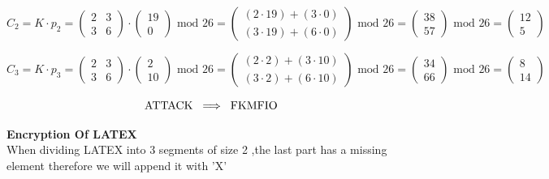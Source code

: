 \[
C_2 = K \cdot p_2 = \begin{pmatrix} 2 & 3 \\ 3 & 6 \end{pmatrix} \cdot \begin{pmatrix} 19 \\ 0
\end{pmatrix} \text{ mod } 26 = \begin{pmatrix} (2 \cdot 19) + (3 \cdot 0) \\ (3 \cdot 19) +
(6 \cdot 0) \end{pmatrix} \text{ mod } 26 = \begin{pmatrix} 38 \\ 57 \end{pmatrix}
\text{ mod } 26 = \boxed{\begin{pmatrix} 12 \\ 5 \end{pmatrix}}
\]

\[
C_3 = K \cdot p_3 = \begin{pmatrix} 2 & 3 \\ 3 & 6 \end{pmatrix} \cdot \begin{pmatrix} 2 \\ 10
\end{pmatrix} \text{ mod } 26 = \begin{pmatrix} (2 \cdot 2) + (3 \cdot 10) \\ (3 \cdot 2) +
(6 \cdot 10) \end{pmatrix} \text{ mod } 26 = \begin{pmatrix} 34 \\ 66 \end{pmatrix}
\text{ mod } 26 = \boxed{\begin{pmatrix} 8 \\ 14 \end{pmatrix}}
\]

\vspace{0.5cm}

\[\text{ATTACK} \hspace{0.2cm} \Longrightarrow \hspace{0.2cm} \text{FKMFIO}\]

\vspace{1cm}


\textbf{Encryption Of LATEX}\\[0.15cm]
When dividing LATEX into 3 segments of size 2 ,the last part has a missing element therefore
we will append it with 'X'

